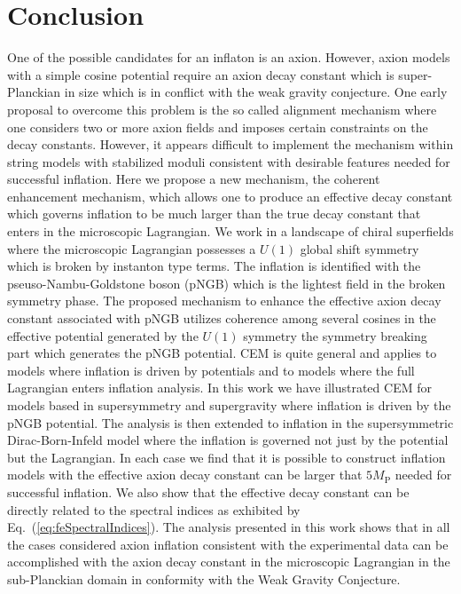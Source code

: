 \documentclass[11pt]{article}
\begin{document}
\section{Conclusion \label{sec:Conclusion}}
One of the possible candidates for an inflaton is an axion.
However, axion models with a simple cosine potential require an axion decay constant which is super-Planckian in size which is in conflict with the weak gravity conjecture.
One early proposal to overcome this problem is the so called alignment mechanism where one considers two or more axion fields and imposes certain constraints on the decay constants.
However, it appears difficult to implement the mechanism within string models with stabilized moduli consistent with desirable features needed for successful inflation.
Here we propose a new mechanism, the coherent enhancement mechanism, which allows one to produce an effective decay constant which governs inflation to be much larger than the true decay constant that enters in the microscopic Lagrangian.
We work in a landscape of chiral superfields where the microscopic Lagrangian possesses a $U\left(1\right)$ global shift symmetry which is broken by instanton type terms.
The inflation is identified with the pseuso-Nambu-Goldstone boson (pNGB) which is the lightest field in the broken symmetry phase.
The proposed mechanism to enhance the effective axion decay constant associated with pNGB utilizes coherence among several cosines in the effective potential generated by the $U\left(1\right)$ symmetry the symmetry breaking part which generates the pNGB potential.
CEM is quite general and applies to models where inflation is driven by potentials and to models where the full Lagrangian enters inflation analysis.
In this work we have illustrated CEM for models based in supersymmetry and supergravity where inflation is driven by the pNGB potential.
The analysis is then extended to inflation in the supersymmetric Dirac-Born-Infeld model where the inflation is governed not just by the potential but the Lagrangian.
In each case we find that it is possible to construct inflation models with the effective axion decay constant can be larger that $5 M_\text{P}$ needed for successful inflation.
We also show that the effective decay constant can be directly related to the spectral indices as exhibited by Eq.~(\ref{eq:feSpectralIndices}).
The analysis presented in this work shows that in all the cases considered axion inflation consistent with the experimental data can be accomplished with the axion decay constant in the microscopic Lagrangian in the sub-Planckian domain in conformity with the Weak Gravity Conjecture.\\~\\~\\
\end{document}
